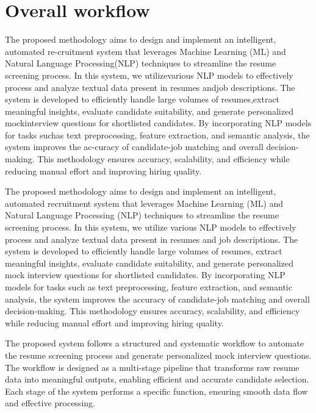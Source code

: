 \section{Overall workflow}
The proposed methodology aims to design and implement an intelligent, automated re-cruitment system that leverages Machine Learning (ML) and Natural Language Processing(NLP) techniques to streamline the resume screening process. In this system, we utilizevarious NLP models to effectively process and analyze textual data present in resumes andjob descriptions. The system is developed to efficiently handle large volumes of resumes,extract meaningful insights, evaluate candidate suitability, and generate personalized mockinterview questions for shortlisted candidates. By incorporating NLP models for tasks suchas text preprocessing, feature extraction, and semantic analysis, the system improves the ac-curacy of candidate-job matching and overall decision-making. This methodology ensures
accuracy, scalability, and efficiency while reducing manual effort and improving hiring
quality.

{%
The proposed methodology aims to design and implement an intelligent, automated recruitment system that leverages Machine Learning (ML) and Natural Language Processing (NLP) techniques to streamline the resume screening process. In this system, we utilize various NLP models to effectively process and analyze textual data present in resumes and job descriptions. The system is developed to efficiently handle large volumes of resumes, extract meaningful insights, evaluate candidate suitability, and generate personalized mock interview questions for shortlisted candidates. By incorporating NLP models for tasks such as text preprocessing, feature extraction, and semantic analysis, the system improves the accuracy of candidate-job matching and overall decision-making. This methodology ensures accuracy, scalability, and efficiency while reducing manual effort and improving hiring quality.}


The proposed system follows a structured and systematic workflow to automate the resume screening process and generate personalized mock interview questions. The workflow is designed as a multi-stage pipeline that transforms raw resume data into meaningful outputs, enabling efficient and accurate candidate selection. Each stage of the system performs a specific function, ensuring smooth data flow and effective processing.

